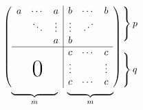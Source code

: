 \documentclass{ctexart}
\newcommand{\adots}{\mathinner{
    \mkern2mu
    \raisebox{0.1em}{.}\mkern2mu\raisebox{0.4em}{.}
    \mkern2mu\raisebox{0.7em}{.}\mkern1mu}
    }
\begin{document}
    \[
        \begin{array}{c@{\hspace{-5pt}}l}
            \left(
                \begin{array}{ccc|ccc}
                    a   & \cdots & a                                                      & b         & \cdots & b      \\
                        & \ddots & \vdots                                                 & \vdots    & \adots          \\
                        &        & a                                                      & b                           \\ \hline

                        &        &                                                        & c         & \cdots  & c     \\
                        &        &                                                        & \vdots    &        & \vdots \\
                    \multicolumn{3}{c|}{\raisebox{2ex}[0pt]{\Huge 0}}                     & c      & \cdots & c
                \end{array}
            \right)
            &

            \begin{array}{l}
                \left.\rule{0mm}{7mm}\right\}p \\
                \\
                \left.\rule{0mm}{7mm}\right\}q
            \end{array}
            \\[-5pt]

            \begin{array}{cc}
                \underbrace{\rule{17mm}{0mm}}_{m} & \underbrace{\rule{17mm}{0mm}}_{m}
            \end{array}

            & %
        \end{array}
    \]
    
\end{document}
